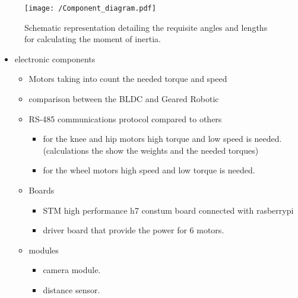 \newpage


\begin{figure}[h]
	\centering
	\texttt{[image: /Component\_diagram.pdf]}
	\caption[Moment of inertia Schematic representation]{Schematic representation detailing the requisite angles and lengths for calculating the moment of inertia.}
	\label{fig:Schematic representation detailing the requisite angles and lengths for calculating the moment of inertia.}
\end{figure}
\begin{itemize}
	\item electronic components 
	\begin{itemize}
		\item Motors taking into count the needed torque and speed
		\item comparison between the BLDC and Geared Robotic 
		\item RS-485 communications protocol compared to others 
		\begin{itemize}
			\item for the knee and hip motors high torque and low speed is needed.(calculations the show the weights and the needed torques)
			\item for the wheel motors high speed and low torque is needed. 
		\end{itemize}
		\item Boards 
		\begin{itemize}
			\item STM high performance h7 constum board connected with rasberrypi 
			\item driver board that provide the power for 6 motors. 
		\end{itemize}
		\item modules 
		\begin{itemize}
			\item camera module.
			\item distance sensor.
		\end{itemize}
	\end{itemize}
\end{itemize}



